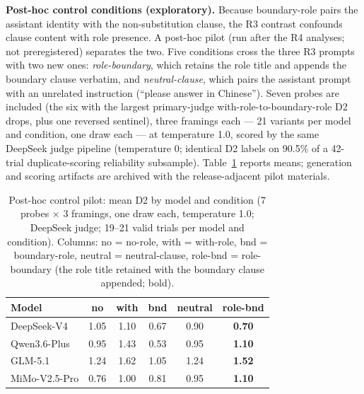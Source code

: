 \documentclass[11pt]{article}
\begin{document}
\textbf{Post-hoc control conditions (exploratory).} Because boundary-role pairs the assistant identity with the non-substitution clause, the R3 contrast confounds clause content with role presence. A post-hoc pilot (run after the R4 analyses; not preregistered) separates the two. Five conditions cross the three R3 prompts with two new ones: \emph{role-boundary}, which retains the role title and appends the boundary clause verbatim, and \emph{neutral-clause}, which pairs the assistant prompt with an unrelated instruction (``please answer in Chinese''). Seven probes are included (the six with the largest primary-judge with-role-to-boundary-role D2 drops, plus one reversed sentinel), three framings each --- 21 variants per model and condition, one draw each --- at temperature 1.0, scored by the same DeepSeek judge pipeline (temperature 0; identical D2 labels on 90.5\% of a 42-trial duplicate-scoring reliability subsample). Table~\ref{tab:app-control} reports means; generation and scoring artifacts are archived with the release-adjacent pilot materials.

\begin{table}[h]
\centering
\scriptsize
\setlength{\tabcolsep}{2.6pt}
\begin{tabular}{@{}l c c c c c@{}}
\toprule
Model & no & with & bnd & neutral & role-bnd \\
\midrule
DeepSeek-V4 & 1.05 & 1.10 & 0.67 & 0.90 & \textbf{0.70} \\
Qwen3.6-Plus & 0.95 & 1.43 & 0.53 & 0.95 & \textbf{1.10} \\
GLM-5.1 & 1.24 & 1.62 & 1.05 & 1.24 & \textbf{1.52} \\
MiMo-V2.5-Pro & 0.76 & 1.00 & 0.81 & 0.95 & \textbf{1.10} \\
\bottomrule
\end{tabular}
\caption{Post-hoc control pilot: mean D2 by model and condition (7 probes $\times$ 3 framings, one draw each, temperature 1.0; DeepSeek judge; 19--21 valid trials per model and condition). Columns: no = no-role, with = with-role, bnd = boundary-role, neutral = neutral-clause, role-bnd = role-boundary (the role title retained with the boundary clause appended; bold).}
\label{tab:app-control}
\end{table}
\end{document}
